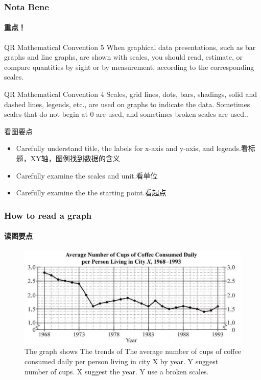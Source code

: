 \documentclass[
	11pt, %
]{beamer}
\begin{document}
\begin{frame}
	\frametitle{Nota Bene} %
	\framesubtitle{重点！}

	\begin{block}{QR Mathematical Convention 5}
		When graphical data presentations, such as bar graphs and line graphs,
are shown with scales, you should read, estimate, or compare quantities
by sight or by measurement, according to the corresponding scales.
	\end{block}

		\begin{block}{QR Mathematical Convention 4}
		Scales, grid lines, dots, bars, shadings, solid and dashed lines, legends,
etc., are used on graphs to indicate the data. Sometimes scales that do not
begin at 0 are used, and sometimes broken scales are used..
	\end{block}
	\begin{alertblock}{看图要点}
		\begin{itemize}
			\item Carefully understand title, the labels for x-axis and y-axis, and legends.看标题，XY轴，图例找到数据的含义
			\item Carefully examine the scales and unit.看单位
			\item Carefully examine the the starting point.看起点
		\end{itemize}
	\end{alertblock}
\end{frame}


\begin{frame}
	\frametitle{How to read a graph} %
	\framesubtitle{读图要点}
	\begin{figure}
		\includegraphics[width=0.8\linewidth]{Graph.png}
		\caption{The graph shows The trends of The average number of cups of coffee consumed daily
per person living in city X by year. Y suggest number of cups. X suggest the year. Y use a broken scales.}
	\end{figure}
\end{frame}
\end{document}
